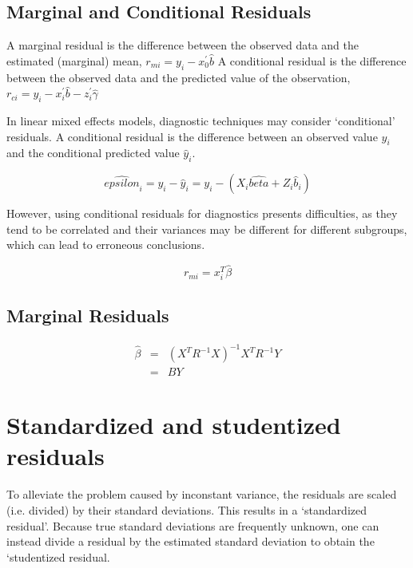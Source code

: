 \documentclass[a4paper,12pt]{article}
\begin{document}
\subsection{Marginal and Conditional Residuals}

A marginal residual is the difference between the observed data and the estimated (marginal) mean, $r_{mi} = y_i - x_0^{\prime} \hat{b}$
A conditional residual is the difference between the observed data and the predicted value of the observation,
$r_{ci} = y_i - x_i^{\prime} \hat{b} - z_i^{\prime} \hat{\gamma}$

In linear mixed effects models, diagnostic techniques may consider `conditional' residuals. A conditional residual is the difference between an observed value $y_{i}$ and the conditional predicted value $\hat{y}_{i} $.

\[ \hat{epsilon}_{i} = y_{i} - \hat{y}_{i} = y_{i} - ( X_{i}\hat{beta} + Z_{i}\hat{b}_{i}) \]

However, using conditional residuals for diagnostics presents difficulties, as they tend to be correlated and their variances may be different for different subgroups, which can lead to erroneous conclusions.







\begin{equation}
r_{mi}=x^{T}_{i}\hat{\beta}
\end{equation}

	\subsection{Marginal Residuals}
	\begin{eqnarray}
	\hat{\beta} &=& (X^{T}R^{-1}X)^{-1}X^{T}R^{-1}Y \nonumber \\
	&=& BY \nonumber
	\end{eqnarray}

\section{Standardized and studentized residuals} %

To alleviate the problem caused by inconstant variance, the residuals are scaled (i.e. divided) by their standard deviations. This results in a `standardized residual'. Because true standard deviations are frequently unknown, one can instead divide a residual by the estimated standard deviation to obtain the `studentized residual. 
\end{document}
